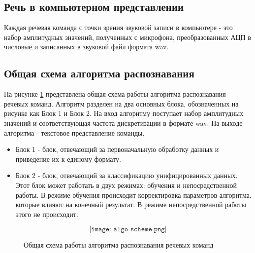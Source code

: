 \subsection{Речь в компьютерном представлении}
Каждая речевая команда с точки зрения звуковой записи в компьютере - это набор амплитудных значений, полученных с микрофона, преобразованных АЦП в числовые и записанных в звуковой файл формата wav.

\subsection{Общая схема алгоритма распознавания}
На рисунке \ref{fig:algo_scheme} представлена общая схема работы алгоритма распознавания речевых команд. Алгоритм разделен на два основных блока, обозначенных на рисунке как Блок 1 и Блок 2. На вход алгоритму поступает набор амплитудных значений и соответствующая частота дискретизации в формате wav. На выходе алгоритма - текстовое представление команды.

\begin{itemize}[leftmargin=2cm]
\item Блок 1 - блок, отвечающий за первоначальную обработку данных и приведение их к единому формату. 
\item Блок 2 - блок, отвечающий за классификацию унифицированных данных. Этот блок может работать в двух режимах: обучения и непосредственной работы. В режиме обучения происходит корректировка параметров алгоритма, которые влияют на конечный результат. В режиме непосредственной работы этого не происходит.
\end{itemize}

\begin{figure}[H]
  \[\texttt{[image: algo\_scheme.png]}\]
  \caption{Общая схема работы алгоритма распознавания речевых команд}
  \label{fig:algo_scheme}
\end{figure}